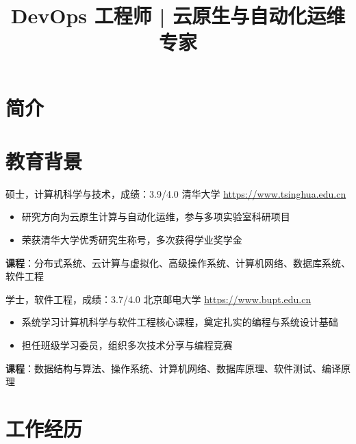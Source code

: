 \documentclass[a4paper, serif, 10pt]{moderncv}
\title{DevOps 工程师 | 云原生与自动化运维专家}
\begin{document}
\maketitle

\section{简介}

\section{教育背景}

        {硕士，计算机科学与技术，成绩：3.9/4.0}
        {清华大学}
        {\url{https://www.tsinghua.edu.cn}}
        {}
        {\begin{itemize}
\item 研究方向为云原生计算与自动化运维，参与多项实验室科研项目
\item 荣获清华大学优秀研究生称号，多次获得学业奖学金
\end{itemize}
\textbf{课程}：分布式系统、云计算与虚拟化、高级操作系统、计算机网络、数据库系统、软件工程}

        {学士，软件工程，成绩：3.7/4.0}
        {北京邮电大学}
        {\url{https://www.bupt.edu.cn}}
        {}
        {\begin{itemize}
\item 系统学习计算机科学与软件工程核心课程，奠定扎实的编程与系统设计基础
\item 担任班级学习委员，组织多次技术分享与编程竞赛
\end{itemize}
\textbf{课程}：数据结构与算法、操作系统、计算机网络、数据库原理、软件测试、编译原理}
\section{工作经历}
\end{document}
